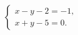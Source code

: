 \begin{ex}
	\begin{condition}
		\( \left\{
		\begin{array}{l}
			x-y-2=-1,\\
			x+y-5=0.
		\end{array}
		\right. \)
	\end{condition}
\end{ex}